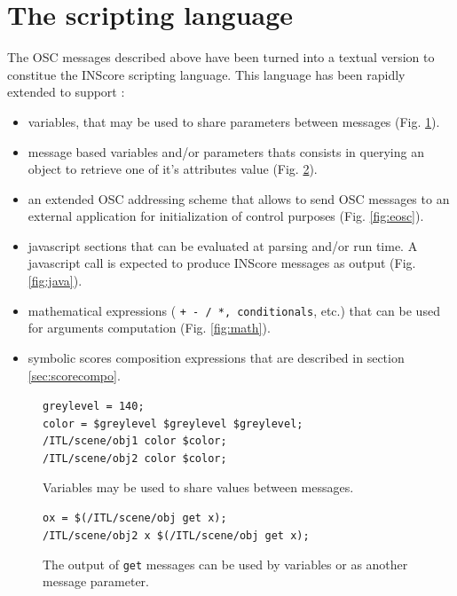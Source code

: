 \documentclass[11pt,a4paper]{article}
\newcommand{\OSC}[1]	{{\fontsize{10pt}{10pt} \selectfont\texttt{#1}}}
\newcommand{\sample}[1]	{\vspace{-0.2em}\begin{center}\colorbox{mygrey}{\begin{minipage}[t]{0.98\columnwidth} {\small \texttt{#1}}\end{minipage}}\end{center}}
\begin{document}
\section{The scripting language}
The OSC messages described above have been turned into a textual version to constitue the INScore scripting language. This language has been rapidly extended to support :
\begin{itemize}
\item variables, that may be used to share parameters between messages (Fig. \ref{fig:var}).
\item message based variables and/or parameters thats consists in querying an object to retrieve one of it's attributes value (Fig. \ref{fig:msgvar}).
\item an extended OSC addressing scheme that allows to send OSC messages to an external application for initialization of control purposes (Fig. \ref{fig:eosc}).
\item javascript sections that can be evaluated at parsing and/or run time. A javascript call is expected to produce INScore messages as output (Fig. \ref{fig:java}).
\item mathematical expressions (\OSC{+ - / *, conditionals}, etc.) that can be used for arguments computation (Fig. \ref{fig:math}).
\item symbolic scores composition expressions that are described in section \ref{sec:scorecompo}. 
\end{itemize}

\begin{figure}[ht]
\begin{center}
\sample{greylevel = 140;\\
color = \$greylevel \$greylevel \$greylevel; \\
/ITL/scene/obj1 color \$color; \\
/ITL/scene/obj2 color \$color;
}
\caption{Variables may be used to share values between messages.}
\label{fig:var}
\end{center}
\end{figure}

\begin{figure}[ht]
\begin{center}
\sample{ox = \$(/ITL/scene/obj get x);\\
/ITL/scene/obj2 x \$(/ITL/scene/obj get x);
}
\caption{The output of \OSC{get} messages can be used by variables or as another message parameter.}
\label{fig:msgvar}
\end{center}
\end{figure}
\end{document}
